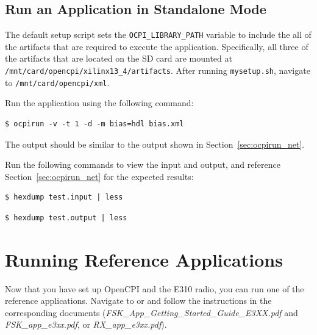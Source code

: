 \newpage
\subsection{Run an Application in Standalone Mode}
\begin{flushleft}
The default setup script sets the \texttt{OCPI\_LIBRARY\_PATH} variable to include the all of the artifacts that are required to execute the application. Specifically, all three of the artifacts that are located on the SD card are mounted at \texttt{/mnt/card/opencpi/xilinx13\_4/artifacts}.  After running \texttt{mysetup.sh}, navigate to \texttt{/mnt/card/opencpi/xml}.

Run the application using the following command:
\begin{verbatim}
$ ocpirun -v -t 1 -d -m bias=hdl bias.xml
\end{verbatim}
The output should be similar to the output shown in Section~\ref{sec:ocpirun_net}.
\end{flushleft}

\noindent Run the following commands to view the input and output, and reference Section~\ref{sec:ocpirun_net} for the expected results: \\
\begin{verbatim}
$ hexdump test.input | less
\end{verbatim}
\begin{verbatim}
$ hexdump test.output | less
\end{verbatim}

\section{Running Reference Applications}
Now that you have set up OpenCPI and the E310 radio, you can run one of the reference applications. Navigate to  or  and follow the instructions in the corresponding documents (\textit{FSK\_App\_Getting\_Started\_Guide\_E3XX.pdf} and \textit{FSK\_app\_e3xx.pdf}, or \textit{RX\_app\_e3xx.pdf}).
\newpage

